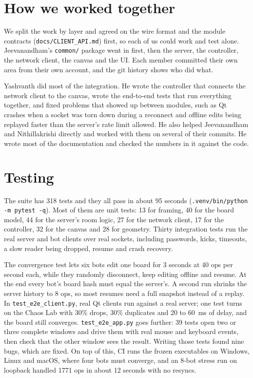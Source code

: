 \documentclass[11pt,a4paper]{article}
\newcommand{\file}[1]{\texttt{#1}}
\begin{document}
\section{How we worked together}

We split the work by layer and agreed on the wire format and the module contracts
(\file{docs/CLIENT\_API.md}) first, so each of us could work and test alone. Jeevanandham's
\file{common/} package went in first, then the server, the controller, the network client, the
canvas and the UI. Each member committed their own area from their own account, and the git
history shows who did what.

Yashvanth did most of the integration. He wrote the controller that connects the network client
to the canvas, wrote the end-to-end tests that run everything together, and fixed problems that
showed up between modules, such as Qt crashes when a socket was torn down during a reconnect and
offline edits being replayed faster than the server's rate limit allowed. He also helped
Jeevanandham and Nithillakrishi directly and worked with them on several of their commits. He
wrote most of the documentation and checked the numbers in it against the code.

\section{Testing}

The suite has 318 tests and they all pass in about 95 seconds (\texttt{.venv/bin/python -m pytest
-q}). Most of them are unit tests: 13 for framing, 40 for the board model, 44 for the server's
room logic, 27 for the network client, 17 for the controller, 32 for the canvas and 28 for
geometry. Thirty integration tests run the real server and bot clients over real sockets,
including passwords, kicks, timeouts, a slow reader being dropped, resume and crash recovery.

The convergence test lets six bots edit one board for 3 seconds at 40 ops per second each, while
they randomly disconnect, keep editing offline and resume. At the end every bot's board hash must
equal the server's. A second run shrinks the server history to 8 ops, so most resumes need a full
snapshot instead of a replay. In \file{test\_e2e\_client.py}, real Qt clients run against a real
server; one test turns on the Chaos Lab with 30\% drops, 30\% duplicates and 20 to 60~ms of
delay, and the board still converges. \file{test\_e2e\_app.py} goes further: 39 tests open two or
three complete windows and drive them with real mouse and keyboard events, then check that the
other window sees the result. Writing those tests found nine bugs, which are fixed. On top of
this, CI runs the frozen executables on Windows, Linux and macOS, where four bots must converge,
and an 8-bot stress run on loopback handled 1771 ops in about 12 seconds with no resyncs.
\end{document}
